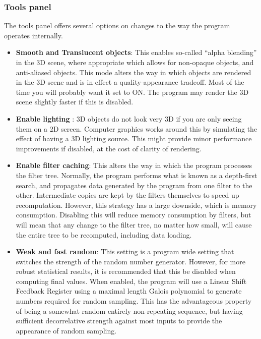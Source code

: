 \documentclass[10pt]{article}
\begin{document}
\subsubsection{Tools panel}
The tools panel offers several options on changes to the way the program operates internally. \begin{itemize}
\item  \textbf{Smooth and Translucent objects}: This enables so-called ``alpha blending'' in the 3D scene, where appropriate which allows for non-opaque objects, and anti-aliased objects. This mode alters the way in which objects are rendered in the 3D scene and is in effect a quality-appearance tradeoff. Most of the time you will probably want it set to ON. The program may render the 3D scene slightly faster if this is disabled.
 
\item  \textbf{Enable lighting} : 3D objects do not look very 3D if you are only seeing them on a 2D screen. Computer graphics works around this by simulating the effect of having a 3D lighting source. This might provide minor performance improvements if disabled, at the cost of clarity of rendering.
 
\item \textbf{Enable filter caching}: This alters the way in which the program processes the filter tree. Normally, the program performs what is known as a depth-first search, and propagates data generated by the program from one filter to the other. Intermediate copies are kept by the filters themselves to speed up recomputation. However, this strategy has a large downside, which is memory consumption. Disabling this will reduce memory consumption by filters, but will mean that any change to the filter tree, no matter how small, will cause the entire tree to be recomputed, including data loading.

\item \textbf{Weak and fast random}: This setting is a program wide setting that switches the strength of the random number generator. However, for more robust statistical results, it is recommended that this be disabled when computing final values. When enabled, the program will use a Linear Shift Feedback Register using a maximal length Galois polynomial to generate numbers required for random sampling. This has the advantageous property of being a somewhat random entirely non-repeating sequence, but having sufficient decorrelative strength against most inputs to provide the appearance of random sampling. 

\end{itemize}
\end{document}
